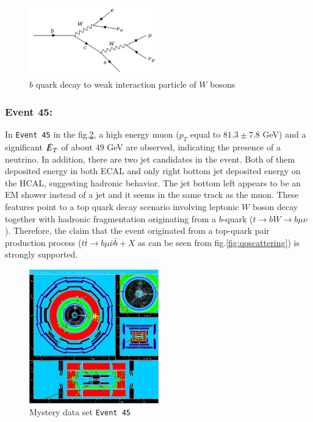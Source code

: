 \begin{figure}[h]
    \centering
	\includegraphics[width=0.5\textwidth]{../figures/bdecay.pdf}
	\caption{$b$ quark decay to weak interaction particle of $W$ bosons}
    \label{fig:bdecay}
\end{figure}
\FloatBarrier


\subsubsection{Event 45:}
In \texttt{Event 45} in the fig.\ref{fig:event45}, a high energy muon ($p_T$ equal to $81.3 \pm 7.8$ GeV) and a significant $ \slashed{E}_T $ of about $49$ GeV are observed, indicating the presence of a neutrino. In addition, there are two jet candidates in the event. Both of them deposited energy in both ECAL and only right bottom jet deposited energy on the HCAL, suggesting hadronic behavior. The jet bottom left appears to be an EM shower instead of a jet and it seems in the same track as the muon. These features point to a top quark decay scenario involving leptonic $W$ boson decay together with hadronic fragmentation originating from a $b$-quark ($t \rightarrow bW \rightarrow b\mu\nu$). Therefore, the claim that the event originated from a top-quark pair production process ($t\bar{t} \rightarrow b\mu\bar{\nu}\bar{b}+X$ as can be seen from fig.\ref{fig:qqscattering}) is strongly supported.

\begin{figure}[h]
    \centering
	\includegraphics[width=0.5\textwidth]{../figures/mystery-event45.pdf}
	\caption{Mystery data set \texttt{Event 45}}
    \label{fig:event45}
\end{figure}
\FloatBarrier


